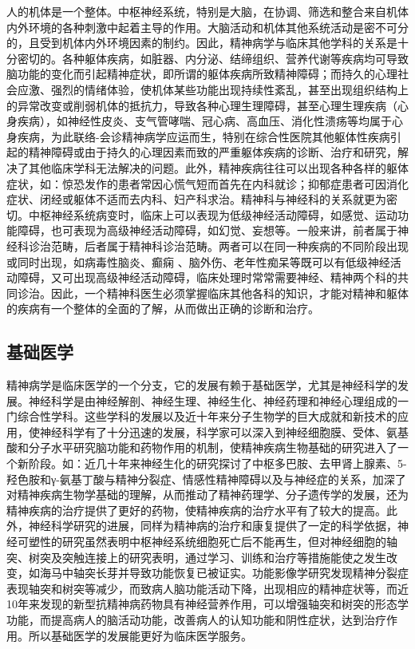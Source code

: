 人的机体是一个整体。中枢神经系统，特别是大脑，在协调、筛选和整合来自机体内外环境的各种刺激中起着主导的作用。大脑活动和机体其他系统活动是密不可分的，且受到机体内外环境因素的制约。因此，精神病学与临床其他学科的关系是十分密切的。各种躯体疾病，如脏器、内分泌、结缔组织、营养代谢等疾病均可导致脑功能的变化而引起精神症状，即所谓的躯体疾病所致精神障碍；而持久的心理社会应激、强烈的情绪体验，使机体某些功能出现持续性紊乱，甚至出现组织结构上的异常改变或削弱机体的抵抗力，导致各种心理生理障碍，甚至心理生理疾病（心身疾病），如神经性皮炎、支气管哮喘、冠心病、高血压、消化性溃疡等均属于心身疾病，为此联络-会诊精神病学应运而生，特别在综合性医院其他躯体性疾病引起的精神障碍或由于持久的心理因素而致的严重躯体疾病的诊断、治疗和研究，解决了其他临床学科无法解决的问题。此外，精神疾病往往可以出现各种各样的躯体症状，如：惊恐发作的患者常因心慌气短而首先在内科就诊；抑郁症患者可因消化症状、闭经或躯体不适而去内科、妇产科求治。精神科与神经科的关系就更为密切。中枢神经系统病变时，临床上可以表现为低级神经活动障碍，如感觉、运动功能障碍，也可表现为高级神经活动障碍，如幻觉、妄想等。一般来讲，前者属于神经科诊治范畴，后者属于精神科诊治范畴。两者可以在同一种疾病的不同阶段出现或同时出现，如病毒性脑炎、癫痫
、脑外伤、老年性痴呆等既可以有低级神经活动障碍，又可出现高级神经活动障碍，临床处理时常常需要神经、精神两个科的共同诊治。因此，一个精神科医生必须掌握临床其他各科的知识，才能对精神和躯体的疾病有一个整体的全面的了解，从而做出正确的诊断和治疗。

\subsection{基础医学}

精神病学是临床医学的一个分支，它的发展有赖于基础医学，尤其是神经科学的发展。神经科学是由神经解剖、神经生理、神经生化、神经药理和神经心理组成的一门综合性学科。这些学科的发展以及近十年来分子生物学的巨大成就和新技术的应用，使神经科学有了十分迅速的发展，科学家可以深入到神经细胞膜、受体、氨基酸和分子水平研究脑功能和药物作用的机制，使精神疾病生物基础的研究进入了一个新阶段。如：近几十年来神经生化的研究探讨了中枢多巴胺、去甲肾上腺素、5-羟色胺和γ-氨基丁酸与精神分裂症、情感性精神障碍以及与神经症的关系，加深了对精神疾病生物学基础的理解，从而推动了精神药理学、分子遗传学的发展，还为精神疾病的治疗提供了更好的药物，使精神疾病的治疗水平有了较大的提高。此外，神经科学研究的进展，同样为精神病的治疗和康复提供了一定的科学依据，神经可塑性的研究虽然表明中枢神经系统细胞死亡后不能再生，但对神经细胞的轴突、树突及突触连接上的研究表明，通过学习、训练和治疗等措施能使之发生改变，如海马中轴突长芽并导致功能恢复已被证实。功能影像学研究发现精神分裂症表现轴突和树突等减少，而致病人脑功能活动下降，出现相应的精神症状等，而近10年来发现的新型抗精神病药物具有神经营养作用，可以增强轴突和树突的形态学功能，而提高病人的脑活动功能，改善病人的认知功能和阴性症状，达到治疗作用。所以基础医学的发展能更好为临床医学服务。

